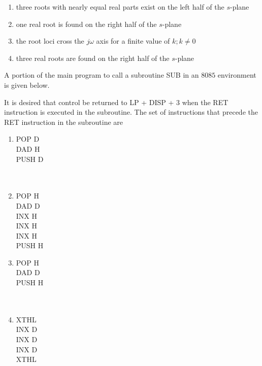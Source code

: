 \begin{enumerate}
\item three roots with nearly equal real parts exist on the left half of the $s$-plane
\item  one real root is found on the right half of the $s$-plane
\item  the root loci cross the $j\omega$ axis for a finite value of $k; k \neq 0$
\item three real roots are found on the right half of the $s$-plane
\end{enumerate}


\item  A portion of the main program to call a subroutine SUB in an $8085$ environment is given below.
\begin{center}
    
\end{center}

It is desired that control be returned to LP + DISP + 3 when the RET instruction is executed in the subroutine. The set of instructions that precede the RET instruction in the subroutine are
\begin{multicols}{4}
\begin{enumerate}
\item POP \hfill{D} \\ DAD \hfill{H}\\ PUSH \hfill{D} \\\\\\
\item  POP \hfill{H}\\ DAD \hfill{D}\\ INX \hfill{H}\\ INX \hfill{H}\\ INX \hfill{H}\\ PUSH \hfill{H}
\item  POP \hfill{H}\\ DAD \hfill{D}\\ PUSH \hfill{H}\\\\\\
\item XTHL\\ INX \hfill{D}\\ INX \hfill{D}\\ INX \hfill{D}\\ XTHL
\end{enumerate}
\end{multicols}

